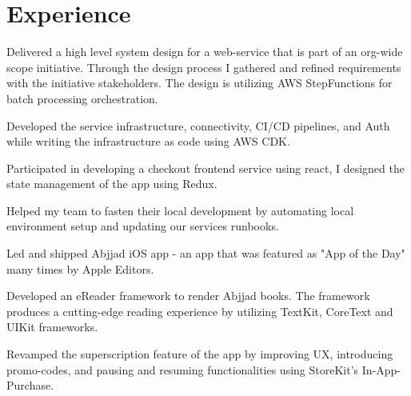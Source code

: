 \documentclass[]{deedy-resume-openfont}
\begin{document}
\begin{minipage}[t]{1\textwidth} 


\section{Experience}
\vspace{\topsep} 
\vspace{\topsep} %
\begin{tightemize}
\item Delivered a high level system design for a web-service that is part of an org-wide scope initiative. Through the design process I gathered and refined requirements with the initiative stakeholders. The design is utilizing AWS StepFunctions for batch processing orchestration.
\item Developed the service infrastructure, connectivity, CI/CD pipelines, and Auth while writing the infrastructure as code using AWS CDK.
\item Participated in developing a checkout frontend service using react, I designed the state management of the app using Redux.
\item Helped my team to fasten their local development by automating local environment setup and updating our services runbooks.
\end{tightemize}
\sectionsep
{}
\vspace{\topsep} 
\vspace{\topsep} %
\begin{tightemize}
\item Led and shipped Abjjad iOS app - an app that was featured as "App of the Day" many times by Apple Editors. 
\item Developed an eReader framework to render Abjjad books. The framework produces a cutting-edge reading experience by utilizing TextKit, CoreText and UIKit frameworks.
\item Revamped the superscription feature of the app by improving UX, introducing promo-codes, and pausing and resuming functionalities using StoreKit's In-App-Purchase.

\end{tightemize}
\end{minipage}
\end{document}
